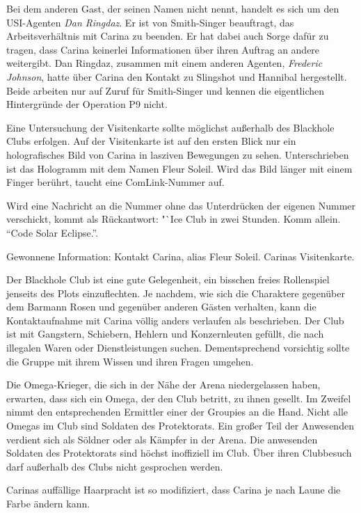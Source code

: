 Bei dem anderen Gast, der seinen Namen nicht nennt, handelt es sich um den USI-Agenten \emph{Dan Ringdaz}. Er ist von Smith-Singer beauftragt, das Arbeitsverhältnis mit Carina zu beenden. Er hat dabei auch Sorge dafür zu tragen, dass Carina keinerlei Informationen über ihren Auftrag an andere weitergibt. Dan Ringdaz, zusammen mit einem anderen Agenten, \emph{Frederic Johnson}, hatte über Carina den Kontakt zu Slingshot und Hannibal hergestellt. Beide arbeiten nur auf Zuruf für Smith-Singer und kennen die eigentlichen Hintergründe der Operation P9 nicht.


Eine Untersuchung der Visitenkarte sollte möglichst außerhalb des Blackhole Clubs erfolgen. Auf der Visitenkarte ist auf den ersten Blick nur ein holografisches Bild von Carina in lasziven Bewegungen zu sehen. Unterschrieben ist das Hologramm mit dem Namen Fleur Soleil. Wird das Bild länger mit einem Finger berührt, taucht eine ComLink-Nummer auf.

Wird eine Nachricht an die Nummer ohne das Unterdrücken der eigenen Nummer verschickt, kommt als Rückantwort: "`Ice Club in zwei Stunden. Komm allein. "`Code Solar Eclipse."'.

\begin{remarks}
	Gewonnene Information: Kontakt Carina, alias Fleur Soleil. Carinas Visitenkarte.

	Der Blackhole Club ist eine gute Gelegenheit, ein bisschen freies Rollenspiel jenseits des Plots einzuflechten. Je nachdem, wie sich die Charaktere gegenüber dem Barmann Rosen und gegenüber anderen Gästen verhalten, kann die Kontaktaufnahme mit Carina völlig anders verlaufen als beschrieben. Der Club ist mit Gangstern, Schiebern, Hehlern und Konzernleuten gefüllt, die nach illegalen Waren oder Dienstleistungen suchen. Dementsprechend vorsichtig sollte die Gruppe mit ihrem Wissen und ihren Fragen umgehen.

	Die Omega-Krieger, die sich in der Nähe der Arena niedergelassen haben, erwarten, dass sich ein Omega, der den Club betritt, zu ihnen gesellt. Im Zweifel nimmt den entsprechenden Ermittler einer der Groupies an die Hand. Nicht alle Omegas im Club sind Soldaten des Protektorats. Ein großer Teil der Anwesenden verdient sich als Söldner oder als Kämpfer in der Arena. Die anwesenden Soldaten des Protektorats sind höchst inoffiziell im Club. Über ihren Clubbesuch darf außerhalb des Clubs nicht gesprochen werden.
	
	Carinas auffällige Haarpracht ist so modifiziert, dass Carina je nach Laune die Farbe ändern kann.
\end{remarks}


